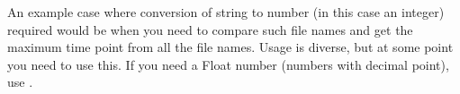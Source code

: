An example case where conversion of string to number (in this case an integer) required would be when you need to compare such file names and get the maximum time point from all the file names. Usage is diverse, but at some point you need to use this. If you need a Float number (numbers with decimal point), use .

\newpage